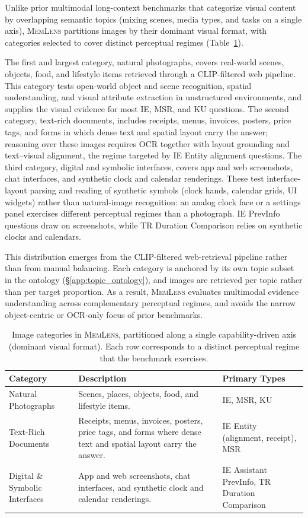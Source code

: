 \documentclass{llmxive}
\providecommand{\bench}{\textsc{MemLens}}
\begin{document}
Unlike prior multimodal long-context benchmarks that categorize visual
content by overlapping semantic topics (mixing scenes, media types, and
tasks on a single axis), \bench{} partitions images by their dominant
visual format, with categories selected to cover distinct perceptual
regimes (Table~\ref{tab:image_categories}).

The first and largest category, natural photographs, covers real-world
scenes, objects, food, and lifestyle items retrieved through a
CLIP-filtered web pipeline. This category tests open-world object and
scene recognition, spatial understanding, and visual attribute extraction
in unstructured environments, and supplies the visual evidence for most
IE, MSR, and KU questions. The second category, text-rich documents,
includes receipts, menus, invoices, posters, price tags, and forms in
which dense text and spatial layout carry the answer; reasoning over these
images requires OCR together with layout grounding and text--visual
alignment, the regime targeted by IE Entity alignment questions. The third
category, digital and symbolic interfaces, covers app and web screenshots,
chat interfaces, and synthetic clock and calendar renderings. These test
interface-layout parsing and reading of synthetic symbols (clock hands,
calendar grids, UI widgets) rather than natural-image recognition: an
analog clock face or a settings panel exercises different perceptual
regimes than a photograph. IE PrevInfo questions draw on screenshots,
while TR Duration Comparison relies on synthetic clocks and calendars.

This distribution emerges from the CLIP-filtered web-retrieval pipeline
rather than from manual balancing. Each category is anchored by its own
topic subset in the ontology (\S\ref{app:topic_ontology}), and images are
retrieved per topic rather than per target proportion. As a result,
\bench{} evaluates multimodal evidence understanding across complementary
perceptual regimes, and avoids the narrow object-centric or OCR-only focus
of prior benchmarks.

\begin{table}[!htbp]
\centering
\small
\begin{tabularx}{\linewidth}{@{}l X l@{}}
\toprule
\textbf{Category} & \textbf{Description} & \textbf{Primary Types} \\
\midrule
Natural Photographs & Scenes, places, objects, food, and lifestyle items. & IE, MSR, KU \\
Text-Rich Documents & Receipts, menus, invoices, posters, price tags, and forms where dense text and spatial layout carry the answer. & IE Entity (alignment, receipt), MSR \\
Digital \& Symbolic Interfaces & App and web screenshots, chat interfaces, and synthetic clock and calendar renderings. & IE Assistant PrevInfo, TR Duration Comparison \\
\bottomrule
\end{tabularx}
\caption{Image categories in \bench{}, partitioned along a single capability-driven axis (dominant visual format). Each row corresponds to a distinct perceptual regime that the benchmark exercises.}
\label{tab:image_categories}
\end{table}
\end{document}
